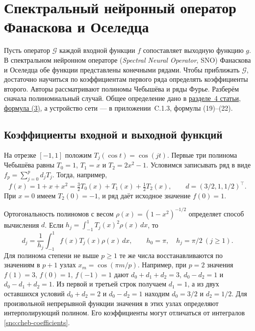 \chapter{Спектральный нейронный оператор Фанаскова и Оселедца}
\label{sno:chapter}

Пусть оператор $\mathcal G$ каждой входной функции $f$ сопоставляет
выходную функцию $g$. В спектральном нейронном операторе
(\emph{Spectral Neural Operator}, SNO) Фанаскова и Оселедца обе функции
представлены конечными рядами. Чтобы приближать $\mathcal G$,
достаточно научиться по коэффициентам первого ряда определять
коэффициенты второго. Авторы рассматривают полиномы Чебышёва и ряды
Фурье. Разберём сначала полиномиальный случай.
Общее определение дано в
\href{https://arxiv.org/html/2205.10573v2\#S4}{разделе~4 статьи, формула (3)},
а устройство сети --- в приложении~C.1.3, формулы (19)--(22).

\section{Коэффициенты входной и выходной функций}
\label{sno:bases}

На отрезке $[-1,1]$ положим $T_j(\cos t)=\cos(jt)$.
Первые три полинома Чебышёва равны $T_0=1$, $T_1=x$ и $T_2=2x^2-1$.
Условимся записывать ряд в виде $f_p=\sum_{j=0}^p d_j T_j$.
Тогда, например,
\[
 f(x)=1+x+x^2=\tfrac32T_0(x)+T_1(x)+\tfrac12T_2(x),
 \qquad d=(3/2,1,1/2)^\top .
\]
При $x=0$ имеем $T_2(0)=-1$, и ряд даёт исходное значение $f(0)=1$.

Ортогональность полиномов с весом $\rho(x)=(1-x^2)^{-1/2}$
определяет способ вычисления $d$. Если
$h_j=\int_{-1}^1 T_j(x)^2\rho(x)\,dx$, то
\begin{equation}
 d_j=\frac{1}{h_j}\int_{-1}^1 f(x)T_j(x)\rho(x)\,dx,
 \qquad h_0=\pi,\quad h_j=\pi/2\ (j\ge1).
 \label{sno:cheb-coefficients}
\end{equation}
Для полинома степени не выше $p\ge1$ те же числа восстанавливаются
по значениям в $p+1$ узлах $x_m=\cos(\pi m/p)$.
Например, при $p=2$ значения $f(1)=3$, $f(0)=1$, $f(-1)=1$ дают
$d_0+d_1+d_2=3$, $d_0-d_2=1$ и $d_0-d_1+d_2=1$.
Из первой и третьей строк получаем $d_1=1$, а из двух оставшихся
условий $d_0+d_2=2$ и $d_0-d_2=1$ находим $d_0=3/2$ и $d_2=1/2$.
Для произвольной непрерывной функции значения в этих узлах определяют
интерполирующий полином. Его коэффициенты могут отличаться от интегралов
\eqref{sno:cheb-coefficients}.

